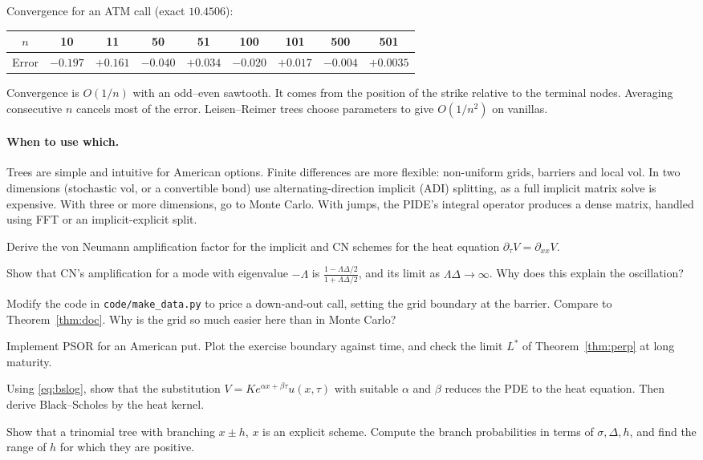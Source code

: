 \begin{numcheck}
Convergence for an ATM call (exact $10.4506$):
\begin{center}
\begin{tabular}{ccccccccc}
\toprule
$n$ & 10 & 11 & 50 & 51 & 100 & 101 & 500 & 501\\
\midrule
Error & $-0.197$ & $+0.161$ & $-0.040$ & $+0.034$ & $-0.020$ & $+0.017$ & $-0.004$ & $+0.0035$\\
\bottomrule
\end{tabular}
\end{center}
Convergence is $O(1/n)$ with an odd--even sawtooth. It comes from the position of the strike relative to the terminal nodes. Averaging consecutive $n$ cancels most of the error. Leisen--Reimer trees choose parameters to give $O(1/n^2)$ on vanillas.
\end{numcheck}

\paragraph{When to use which.} Trees are simple and intuitive for American options. Finite differences are more flexible: non-uniform grids, barriers and local vol. In two dimensions (stochastic vol, or a convertible bond) use alternating-direction implicit (ADI) splitting, as a full implicit matrix solve is expensive. With three or more dimensions, go to Monte Carlo. With jumps, the PIDE's integral operator produces a dense matrix, handled using FFT or an implicit-explicit split.

\begin{exercises}
\item Derive the von Neumann amplification factor for the implicit and CN schemes for the heat equation $\partial_\tau V=\partial_{xx}V$.
\item Show that CN's amplification for a mode with eigenvalue $-\Lambda$ is $\frac{1-\Lambda\Delta/2}{1+\Lambda\Delta/2}$, and its limit as $\Lambda\Delta\to\infty$. Why does this explain the oscillation?
\item Modify the code in \texttt{code/make\_data.py} to price a down-and-out call, setting the grid boundary at the barrier. Compare to Theorem~\ref{thm:doc}. Why is the grid so much easier here than in Monte Carlo?
\item Implement PSOR for an American put. Plot the exercise boundary against time, and check the limit $L^*$ of Theorem~\ref{thm:perp} at long maturity.
\item Using \eqref{eq:bslog}, show that the substitution $V=Ke^{\alpha x+\beta\tau}u(x,\tau)$ with suitable $\alpha$ and $\beta$ reduces the PDE to the heat equation. Then derive Black--Scholes by the heat kernel.
\item Show that a trinomial tree with branching $x\pm h$, $x$ is an explicit scheme. Compute the branch probabilities in terms of $\sigma,\Delta,h$, and find the range of $h$ for which they are positive.
\end{exercises}
